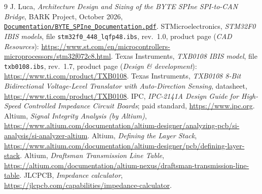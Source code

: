 \documentclass[11pt,a4paper]{article}
\begin{document}
\begin{thebibliography}{9}
 J. Luca, \textit{Architecture Design and Sizing of the BYTE SPIne SPI-to-CAN Bridge}, BARK
Project, October 2026, \href{run:BYTE_SPIne_Documentation.pdf}{\texttt{Documentation/BYTE\_SPIne\_Documentation.pdf}}.
 STMicroelectronics, \textit{STM32F0 IBIS models}, file \texttt{stm32f0\_448\_lqfp48.ibs}, rev.~1.0, product
page (\textit{CAD Resources}): \url{https://www.st.com/en/microcontrollers-microprocessors/stm32f072c8.html}.
 Texas Instruments, \textit{TXB0108 IBIS model}, file \texttt{txb0108.ibs}, rev.~1.7, product page (\textit{Design
\& development}): \url{https://www.ti.com/product/TXB0108}.
 Texas Instruments, \textit{TXB0108 8-Bit Bidirectional Voltage-Level Translator with Auto-Direction
Sensing}, datasheet, \url{https://www.ti.com/product/TXB0108}.
 IPC, \textit{IPC-2141A Design Guide for High-Speed Controlled Impedance Circuit Boards}; paid
standard, \url{https://www.ipc.org}.
 Altium, \textit{Signal Integrity Analysis (by Altium)}, \url{https://www.altium.com/documentation/altium-designer/analyzing-pcb/si-analysis/si-analyzer-altium}.
 Altium, \textit{Defining the Layer Stack}, \url{https://www.altium.com/documentation/altium-designer/pcb/defining-layer-stack}.
 Altium, \textit{Draftsman Transmission Line Table}, \url{https://altium.com/documentation/altium-nexus/draftsman-transmission-line-table}.
 JLCPCB, \textit{Impedance calculator}, \url{https://jlcpcb.com/capabilities/impedance-calculator}.
\end{thebibliography}
\end{document}
